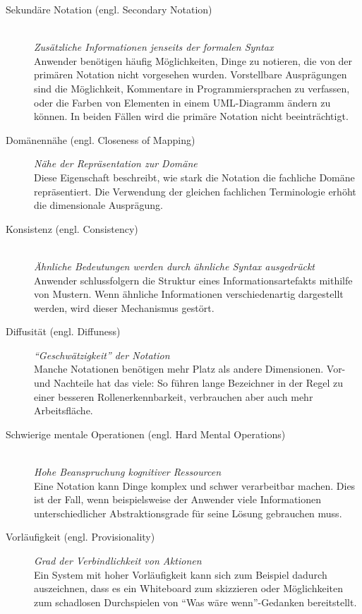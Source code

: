 \begin{important}
\begin{description}
\begin{description}
        \item[Sekundäre Notation (engl. Secondary Notation)] \hfill \\ \textit{Zusätzliche Informationen jenseits der formalen Syntax}\\
        Anwender benötigen häufig Möglichkeiten, Dinge zu notieren, die von der primären Notation nicht vorgesehen wurden. Vorstellbare Ausprägungen sind die Möglichkeit, Kommentare in Programmiersprachen zu verfassen, oder die Farben von Elementen in einem UML-Diagramm ändern zu können. In beiden Fällen wird die primäre Notation nicht beeinträchtigt.
        
        \item[Domänennähe (engl. Closeness of Mapping)] \textit{Nähe der Repräsentation zur Domäne}\\
        Diese Eigenschaft beschreibt, wie stark die Notation die fachliche Domäne repräsentiert. Die Verwendung der gleichen fachlichen Terminologie erhöht die dimensionale Ausprägung.
        
        \item[Konsistenz (engl. Consistency)] \hfill \\ \textit{Ähnliche Bedeutungen werden durch ähnliche Syntax ausgedrückt}\\
        Anwender schlussfolgern die Struktur eines Informationsartefakts mithilfe von Mustern. Wenn ähnliche Informationen verschiedenartig dargestellt werden, wird dieser Mechanismus gestört.
        
        \item[Diffusität (engl. Diffuness)] \textit{``Geschwätzigkeit'' der Notation}\\
        Manche Notationen benötigen mehr Platz als andere Dimensionen. Vor- und Nachteile hat das viele: So führen  lange Bezeichner in der Regel zu einer besseren Rollenerkennbarkeit, verbrauchen aber auch mehr Arbeitsfläche.
        
        \item[Schwierige mentale Operationen (engl. Hard Mental Operations)] \hfill \\ \textit{Hohe Beanspruchung kognitiver Ressourcen}\\
        Eine Notation kann Dinge komplex und schwer verarbeitbar machen. Dies ist der Fall, wenn beispielsweise der Anwender viele Informationen unterschiedlicher Abstraktionsgrade für seine Lösung gebrauchen muss.
        
        \item[Vorläufigkeit (engl. Provisionality)] \textit{Grad der Verbindlichkeit von Aktionen}\\
        Ein System mit hoher Vorläufigkeit kann sich zum Beispiel dadurch auszeichnen, dass es ein Whiteboard zum skizzieren oder Möglichkeiten zum schadlosen Durchspielen von ``Was wäre wenn''-Gedanken bereitstellt.
        

\end{description}
\end{description}
\end{important}
